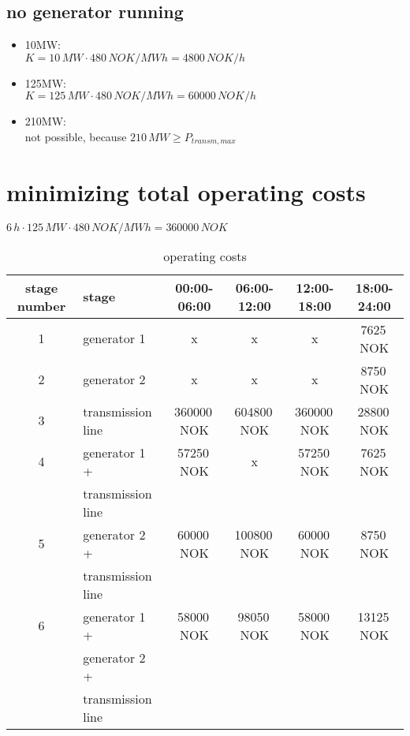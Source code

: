 \documentclass{article}
\begin{document}
		\subsection{no generator running}
			\begin{itemize}
				\item 10MW:\\
					$K=10\,MW\cdot 480\,NOK/MWh=4800\,NOK/h$
				\item 125MW:\\
					$K=125\,MW\cdot 480\,NOK/MWh=60000\,NOK/h$
				\item 210MW:\\
					not possible, because $210\,MW\geq P_{transm,max}$
			\end{itemize}
	\section{minimizing total operating costs}
$6\,h\cdot 125\,MW\cdot 480\,NOK/MWh=360000\,NOK$
	\begin{table}[hbt!]
\begin{center}
\begin{tabular}[h]{|c|l||c|c|c|c|}
\hline 
stage number & stage 						&				00:00-06:00		&	06:00-12:00		&		12:00-18:00		&		18:00-24:00\\
\hline
\hline
1 & generator 1					&				x				&	x				&		x				&		7625\,NOK\\
\hline
2 & generator 2					&				x				&	x				&		x				&		8750\,NOK\\
\hline
3 & transmission line			&				360000\,NOK 	& 	604800\,NOK 	& 		360000\,NOK 	& 		28800\,NOK\\
\hline
4 & generator 1 + 				&				57250\,NOK		&	x				&		57250\,NOK		&		7625\,NOK\\
  & transmission line			&								&					&						&				\\
\hline
5 & generator 2 +				&				60000\,NOK		&	100800\,NOK		&		60000\,NOK		&		8750\,NOK\\
  & transmission line			&								&					&						&				\\
\hline
6 & generator 1 +				&				58000\,NOK		&	98050\,NOK		&		58000\,NOK		&		13125\,NOK\\
  & generator 2 +				&								&					&						&				\\
  & transmission line			&								&					&						&				\\
\hline
\end{tabular}
\caption{operating costs}\label{tab:opcost}
\end{center}
\end{table}
\end{document}
